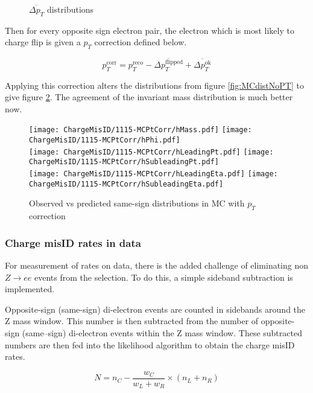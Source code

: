 \begin{figure}[h]
\ContinuedFloat
{}
\caption{$\overline{\Delta p_T}$ distributions}
\label{fig:AvgDPTdist}
\end{figure}

\FloatBarrier

Then for every opposite sign electron pair, the electron which is most likely to charge flip is given a $p_T$ correction defined below.

$$p_T^{\text{corr}} = p_T^{\text{reco}} - \overline{\Delta p_T^{\text{flipped}}} + \overline{\Delta p_T^{\text{ok}}}$$

Applying this correction alters the distributions from figure \ref{fig:MCdistNoPT} to give figure \ref{fig:MCdistWPT}. The agreement of the invariant mass distribution is much better now. 

\begin{figure}[h]
\centering
\texttt{[image: ChargeMisID/1115-MCPtCorr/hMass.pdf]}
\texttt{[image: ChargeMisID/1115-MCPtCorr/hPhi.pdf]}\\
\texttt{[image: ChargeMisID/1115-MCPtCorr/hLeadingPt.pdf]}
\texttt{[image: ChargeMisID/1115-MCPtCorr/hSubleadingPt.pdf]}\\
\texttt{[image: ChargeMisID/1115-MCPtCorr/hLeadingEta.pdf]}
\texttt{[image: ChargeMisID/1115-MCPtCorr/hSubleadingEta.pdf]}
\caption{Observed vs predicted same-sign distributions in MC with $p_T$ correction}
\label{fig:MCdistWPT}
\end{figure}
\FloatBarrier

\subsubsection*{Charge misID rates in data}
For measurement of rates on data, there is the added challenge of eliminating non $Z\rightarrow ee$ events from the selection. To do this, a simple sideband subtraction is implemented.

Opposite-sign (same-sign) di-electron events are counted in sidebands around the Z mass window. This number is then subtracted from the number of opposite-sign (same--sign) di-electron events within the Z mass window. These subtracted numbers are then fed into the likelihood algorithm to obtain the charge misID rates. 

$$N = n_C - \frac{w_C}{w_L + w_R} \times (n_L + n_R)$$

